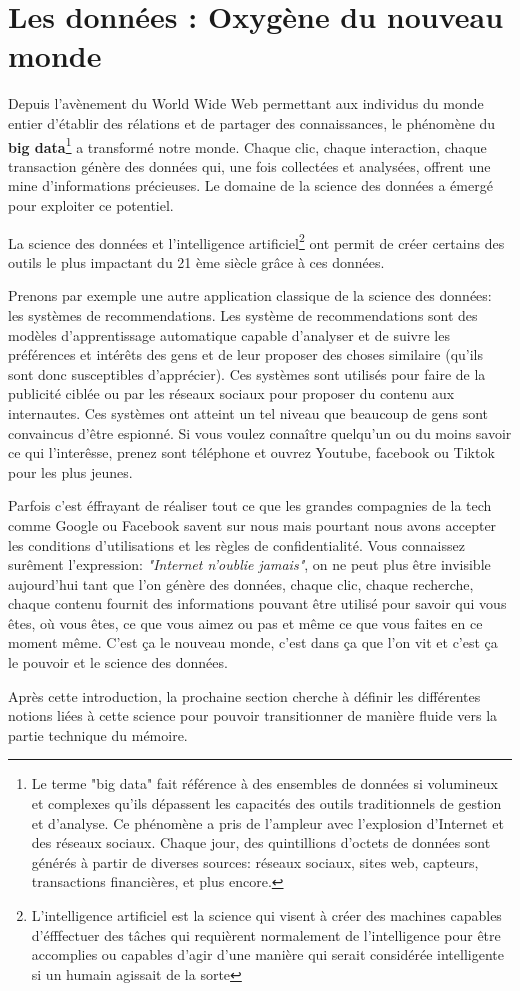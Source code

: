 \section{Les données : Oxygène du nouveau monde}
\label{chap2.section1}
Depuis l’avènement du World Wide Web permettant aux individus du monde entier d'établir des rélations et de partager des connaissances, le phénomène du \textbf{big data}\footnote{Le terme "big data" fait référence à des ensembles de données si volumineux et complexes qu'ils dépassent les capacités des outils traditionnels de gestion et d’analyse. Ce phénomène a pris de l'ampleur avec l'explosion d'Internet et des réseaux sociaux. Chaque jour, des quintillions d'octets de données sont générés à partir de diverses sources: réseaux sociaux, sites web, capteurs, transactions financières, et plus encore.} a transformé notre monde. Chaque clic, chaque interaction, chaque transaction génère des données qui, une fois collectées et analysées, offrent une mine d’informations précieuses. Le domaine de la science des données a émergé pour exploiter ce potentiel.

La science des données et l'intelligence artificiel\footnote{L'intelligence artificiel est la science qui visent à créer des machines capables d'éfffectuer des tâches qui requièrent normalement de l'intelligence pour être accomplies ou capables d'agir d'une manière qui serait considérée intelligente si un humain agissait de la sorte} ont permit de créer certains des outils le plus impactant du 21 ème siècle grâce à ces données. 

Prenons par exemple une autre application classique de la science des données: les systèmes de recommendations. Les système de recommendations sont des modèles d'apprentissage automatique capable d'analyser et de suivre les préférences et intérêts des gens et de leur proposer des choses similaire (qu'ils sont donc susceptibles d'apprécier). Ces systèmes sont utilisés pour faire de la publicité ciblée ou par les réseaux sociaux pour proposer du contenu aux internautes. Ces systèmes ont atteint un tel niveau que beaucoup de gens sont convaincus d'être espionné. Si vous voulez connaître quelqu'un ou du moins savoir ce qui l'interêsse, prenez sont téléphone et ouvrez Youtube, facebook ou Tiktok pour les plus jeunes.

Parfois c'est éffrayant de réaliser tout ce que les grandes compagnies de la tech comme Google ou Facebook savent sur nous mais pourtant nous avons accepter les conditions d'utilisations et les règles de confidentialité. Vous connaissez surêment l'expression: \textit{"Internet n'oublie jamais"}, on ne peut plus être invisible aujourd'hui tant que l'on génère des données, chaque clic, chaque recherche, chaque contenu fournit des informations pouvant être utilisé pour savoir qui vous êtes, où vous êtes, ce que vous aimez ou pas et même ce que vous faites en ce moment même. C'est ça le nouveau monde, c'est dans ça que l'on vit et c'est ça le pouvoir et le science des données.

Après cette introduction, la prochaine section cherche à définir les différentes notions liées à cette science pour pouvoir transitionner de manière fluide vers la partie technique du mémoire. 